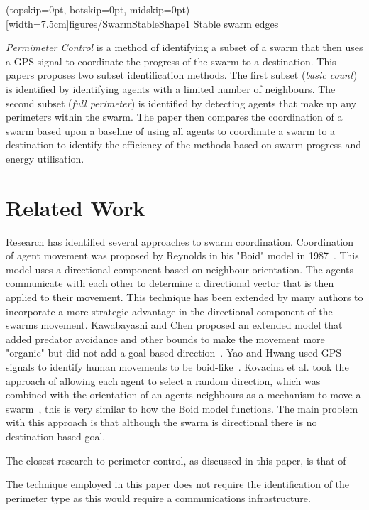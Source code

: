\documentclass{ieeeaccess}
\begin{document}
\Figure[t!](topskip=0pt, botskip=0pt, midskip=0pt)[width=7.5cm]{figures/SwarmStableShape1}
{Stable swarm edges\label{concave:SwarmStableShape1}}

\textit{Permimeter Control} is a method of identifying a subset of a swarm that then uses a GPS signal to coordinate the progress of the swarm to a destination. This papers proposes two subset identification methods. The first subset (\textit{basic count}) is identified by identifying agents with a limited number of neighbours. The second subset (\textit{full perimeter}) is identified by detecting agents that make up any perimeters within the swarm. The paper then compares the coordination of a swarm based upon a baseline of using all agents to coordinate a swarm to a destination to identify the efficiency of the methods based on swarm progress and energy utilisation. 

\section{Related Work}\label{sec:RelatedWork}
Research has identified several approaches to swarm coordination. Coordination of agent movement was proposed by Reynolds in his "Boid" model in 1987~\cite{REY:87}. This model uses a directional component based on neighbour orientation. The agents communicate with each other to determine a directional vector that is then applied to their movement. This technique has been extended by many authors to incorporate a more strategic advantage in the directional component of the swarms movement. Kawabayashi and Chen proposed an extended model that added predator avoidance and other bounds to make the movement more "organic" but did not add a goal based direction~\cite{KC:08}. Yao and Hwang used GPS signals to identify human movements to be boid-like~\cite{YH:14}. Kovacina et al. took the approach of allowing each agent to select a random direction, which was combined with the orientation of an agents neighbours as a mechanism to move a swarm~\cite{MPYV:02}, this is very similar to how the Boid model functions. The main problem with this approach is that although the swarm is directional there is no destination-based goal.   


The closest research to perimeter control, as discussed in this paper, is that of 

The technique employed in this paper does not require the identification of the perimeter type as this would require a communications infrastructure.
\end{document}
